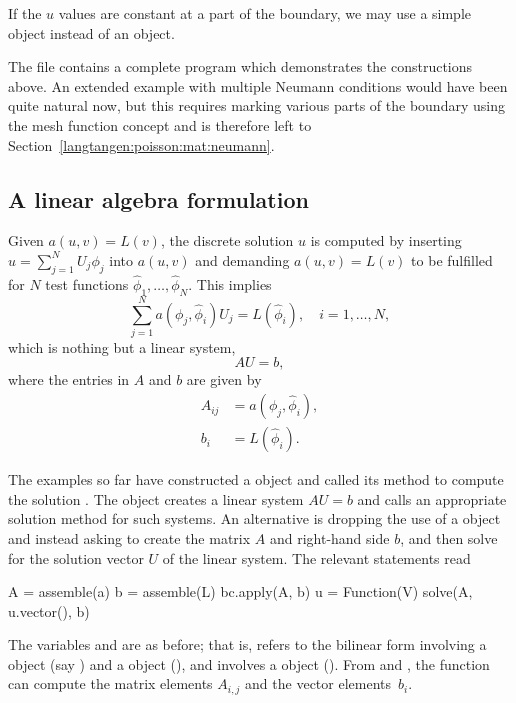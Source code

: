 If the $u$ values are constant at a part of the boundary, we may use a
simple  object instead of an  object.

The file  contains a complete program which
demonstrates the constructions above.  An extended example with multiple
Neumann conditions would have been quite natural now, but this requires
marking various parts of the boundary using the mesh function concept
and is therefore left to Section~\ref{langtangen:poisson:mat:neumann}.

\subsection{A linear algebra formulation}
\label{langtangen:poisson1:linalg}

Given $a(u,v)=L(v)$, the discrete solution $u$ is computed by
inserting $u=\sum_{j=1}^N U_j \phi_j$ into $a(u,v)$ and demanding
$a(u,v)=L(v)$ to be fulfilled for $N$ test functions
$\hat\phi_1,\ldots,\hat\phi_N$. This implies
\begin{equation}
 \sum_{j=1}^N a(\phi_j,\hat\phi_i) U_j = L(\hat\phi_i),\quad i=1,\ldots,N,
\end{equation}
which is nothing but a linear system,
\begin{equation}
  AU = b,
\end{equation}
where the entries in $A$ and $b$ are given by
\begin{equation}
\begin{split}
  A_{ij} &= a(\phi_j, \hat{\phi}_i), \\
  b_i &= L(\hat\phi_i).
\end{split}
\end{equation}

The examples so far have constructed a  object
and called its  method to compute the solution .
The  object creates a linear system $AU=b$ and
calls an appropriate solution method for such systems.  An alternative
is dropping the use of a  object and instead
asking \fenics{} to create the matrix $A$ and right-hand side $b$,
and then solve for the solution vector $U$ of the linear system.
The relevant statements read
\begin{python}
A = assemble(a)
b = assemble(L)
bc.apply(A, b)
u = Function(V)
solve(A, u.vector(), b)
\end{python}
The variables  and  are as before; that is, 
refers to the bilinear form involving a  object
(say ) and a  object (), and 
involves a  object (). From  and ,
the  function can compute the matrix elements $A_{i,j}$
and the vector elements~$b_i$.

